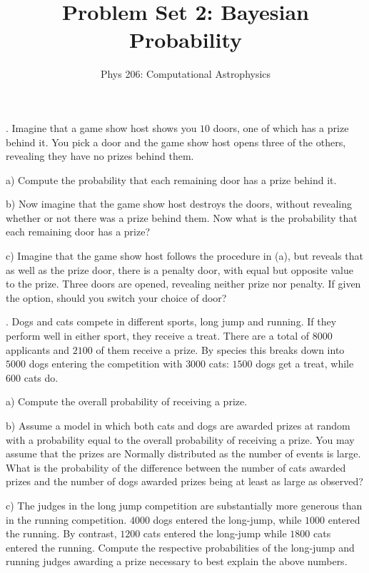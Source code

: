 \documentclass[10pt]{article}
\newenvironment{problem}[2][Problem]{\begin{trivlist}
\item[\hskip \labelsep {\bfseries #1}\hskip \labelsep {\bfseries #2}]}{\end{trivlist}}
\begin{document}
\title{Problem Set 2: Bayesian Probability}
\author{Phys 206: Computational Astrophysics}
\maketitle

\begin{problem}{2.0 Advanced Monty Hall (6)}.
Imagine that a game show host shows you $10$ doors, one of which has a prize behind it. You pick a door and the game show host opens three of the others, revealing they have no prizes behind them.

a) Compute the probability that each remaining door has a prize behind it.

b) Now imagine that the game show host destroys the doors, without revealing whether or not there was a prize behind them. Now what is the probability that each remaining door has a prize?

c) Imagine that the game show host follows the procedure in (a), but reveals that as well as the prize door, there is a penalty door, with equal but opposite value to the prize. Three doors are opened, revealing neither prize nor penalty. If given the option, should you switch your choice of door?
\end{problem}

\begin{problem}{2.1 Simpson's Paradox (6)}.
Dogs and cats compete in different sports, long jump and running. If they perform well in either sport, they receive a treat. There are a total of $8000$ applicants and $2100$ of them receive a prize. By species this breaks down into $5000$ dogs entering the competition with $3000$ cats: $1500$ dogs get a treat, while $600$ cats do.

a) Compute the overall probability of receiving a prize.

b) Assume a model in which both cats and dogs are awarded prizes at random with a probability equal to the overall probability of receiving a prize. You may assume that the prizes are Normally distributed as the number of events is large. What is the probability of the difference between the number of cats awarded prizes and the number of dogs awarded prizes being at least as large as observed?

c) The judges in the long jump competition are substantially more generous than in the running competition. $4000$ dogs entered the long-jump, while $1000$ entered the running. By contrast, $1200$ cats entered the long-jump while $1800$ cats entered the running. Compute the respective probabilities of the long-jump and running judges awarding a prize necessary to best explain the above numbers.
\end{problem}
\end{document}
